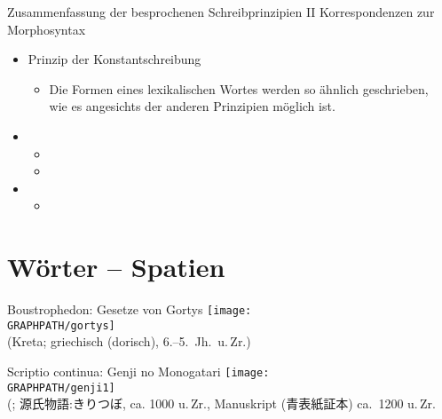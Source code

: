\begin{frame}
  {Zusammenfassung der besprochenen Schreibprinzipien II}
  Korrespondenzen zur Morphosyntax\\
  \Zeile
  \pause
  \begin{itemize}[<+->]
    \item \alert{Prinzip der Konstantschreibung}
      \begin{itemize}[<+->]
        \item Die Formen eines lexikalischen Wortes werden so ähnlich geschrieben,\\
          wie es angesichts der anderen Prinzipien möglich ist.
      \end{itemize}
      \Zeile
    \item {}
      \begin{itemize}[<+->]
        \item {}
        \item {}
      \end{itemize}
      \Zeile
    \item {}
      \begin{itemize}[<+->]
        \item {}
      \end{itemize}
  \end{itemize}
\end{frame}



\section{Wörter -- Spatien}

\begin{frame}
  {Boustrophedon: Gesetze von Gortys}
  \pause
  \centering
  \texttt{[image: \\GRAPHPATH/gortys]}\\
  {\tiny (Kreta; griechisch (dorisch), 6.--5.\ Jh.\ u.\,Zr.)}
\end{frame}

\begin{frame}
  {Scriptio continua: Genji no Monogatari}
  \pause
  \centering
  \texttt{[image: \\GRAPHPATH/genji1]}\\
  {\tiny (\citealt{Rickmeyer1991}; 源氏物語:きりつぼ, ca. 1000 u.\,Zr., Manuskript (青表紙証本) ca.\ 1200 u.\,Zr.}
\end{frame}

